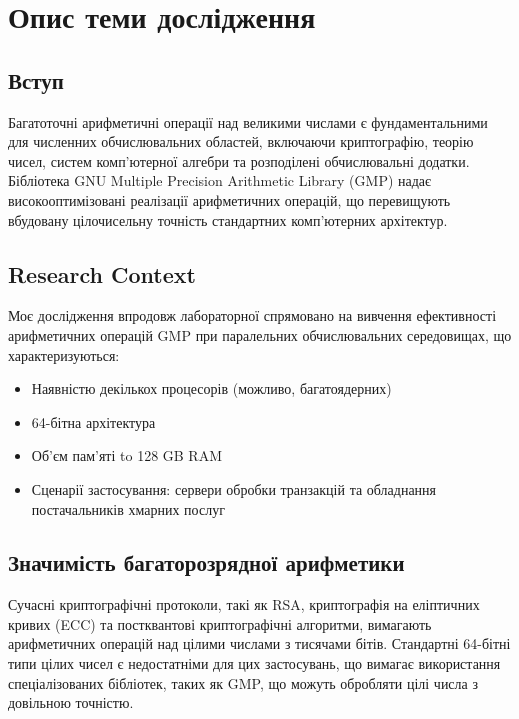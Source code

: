 \section{Опис теми дослідження}

\subsection{Вступ}
Багатоточні арифметичні операції над великими числами є фундаментальними для численних обчислювальних областей, 
включаючи криптографію, теорію чисел, систем комп'ютерної алгебри та розподілені обчислювальні додатки. Бібліотека 
GNU Multiple Precision Arithmetic Library (GMP) надає високооптимізовані реалізації арифметичних операцій, що 
перевищують вбудовану цілочисельну точність стандартних комп'ютерних архітектур.

\subsection{Research Context}
Моє дослідження впродовж лабораторної спрямовано на вивчення ефективності арифметичних операцій GMP при паралельних 
обчислювальних середовищах, що характеризуються:
\begin{itemize}
    \item Наявністю декількох процесорів (можливо, багатоядерних)
    \item 64-бітна архітектура
    \item Об'єм пам'яті to 128 GB RAM
    \item Сценарії застосування: сервери обробки транзакцій та обладнання постачальників хмарних послуг
\end{itemize}

\subsection{Значимість багаторозрядної арифметики}
Сучасні криптографічні протоколи, такі як RSA, криптографія на еліптичних кривих (ECC) та постквантові криптографічні 
алгоритми, вимагають арифметичних операцій над цілими числами з тисячами бітів. Стандартні 64-бітні типи цілих чисел 
є недостатніми для цих застосувань, що вимагає використання спеціалізованих бібліотек, таких як GMP, що можуть 
обробляти цілі числа з довільною точністю.

